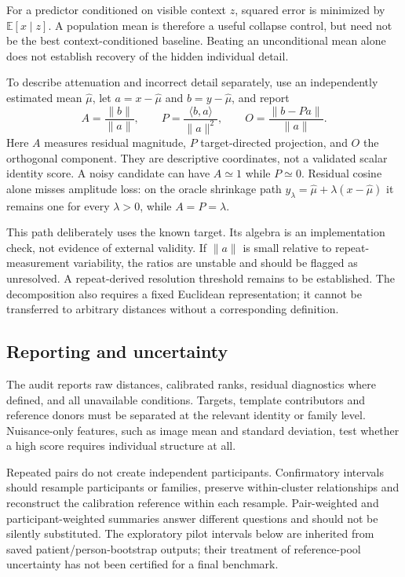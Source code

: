 \documentclass[10pt,twocolumn,letterpaper]{article}
\newcommand{\E}{\mathbb{E}}
\begin{document}
For a predictor conditioned on visible context $z$, squared error is minimized by $\E[x\mid z]$. A population mean is therefore a useful collapse control, but need not be the best context-conditioned baseline. Beating an unconditional mean alone does not establish recovery of the hidden individual detail.

To describe attenuation and incorrect detail separately, use an independently estimated mean $\hat\mu$, let $a=x-\hat\mu$ and $b=y-\hat\mu$, and report
\begin{equation}
A=\frac{\|b\|}{\|a\|},\qquad
P=\frac{\langle b,a\rangle}{\|a\|^2},\qquad
O=\frac{\|b-Pa\|}{\|a\|}.
\label{eq:residuals}
\end{equation}
Here $A$ measures residual magnitude, $P$ target-directed projection, and $O$ the orthogonal component. They are descriptive coordinates, not a validated scalar identity score. A noisy candidate can have $A\simeq1$ while $P\simeq0$. Residual cosine alone misses amplitude loss: on the oracle shrinkage path $y_\lambda=\hat\mu+\lambda(x-\hat\mu)$ it remains one for every $\lambda>0$, while $A=P=\lambda$.

This path deliberately uses the known target. Its algebra is an implementation check, not evidence of external validity. If $\|a\|$ is small relative to repeat-measurement variability, the ratios are unstable and should be flagged as unresolved. A repeat-derived resolution threshold remains to be established. The decomposition also requires a fixed Euclidean representation; it cannot be transferred to arbitrary distances without a corresponding definition.

\subsection{Reporting and uncertainty}
The audit reports raw distances, calibrated ranks, residual diagnostics where defined, and all unavailable conditions. Targets, template contributors and reference donors must be separated at the relevant identity or family level. Nuisance-only features, such as image mean and standard deviation, test whether a high score requires individual structure at all.

Repeated pairs do not create independent participants. Confirmatory intervals should resample participants or families, preserve within-cluster relationships and reconstruct the calibration reference within each resample. Pair-weighted and participant-weighted summaries answer different questions and should not be silently substituted. The exploratory pilot intervals below are inherited from saved patient/person-bootstrap outputs; their treatment of reference-pool uncertainty has not been certified for a final benchmark.
\end{document}
